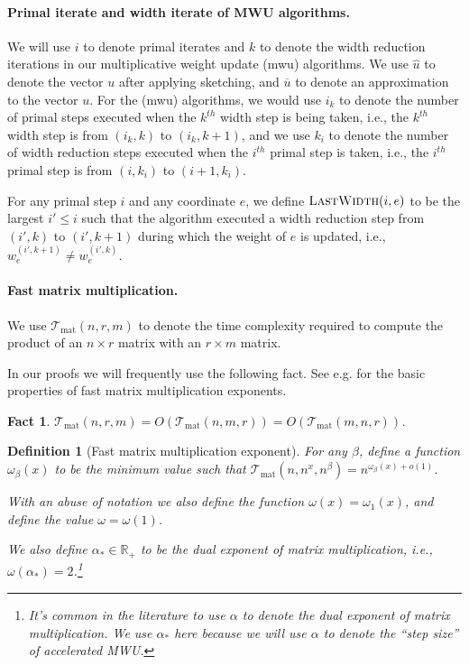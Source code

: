 \documentclass[11pt]{article}
\newtheorem{fact}[theorem]{Fact}
\newtheorem{definition}[theorem]{Definition}
\newcommand{\Tmat}{\mathcal{T}_{\mathrm{mat}}}
\newcommand\uu{\boldsymbol{\mathit{u}}}
\newcommand\ww{\boldsymbol{\mathit{w}}}
\newcommand{\wh}{\widehat}
\newcommand{\ov}{\overline}
\newcommand\R{\mathbb{R}}
\begin{document}
\paragraph{Primal iterate and width iterate of MWU algorithms.} We will use $i$ to denote primal iterates and $k$ to denote the width reduction iterations in our multiplicative weight update (mwu) algorithms. We use $\wh{\uu}$ to denote the vector $\uu$ after applying sketching, and $\ov{\uu}$ to denote an approximation to the vector $\uu$. For the (mwu) algorithms, we would use $i_k$ to denote the number of primal steps executed when the $k^{th}$ width step is being taken, i.e., the $k^{th}$ width step is from $(i_k, k)$ to $(i_k, k+1)$, and we use $k_i$ to denote the number of width reduction steps executed when the $i^{th}$ primal step is taken, i.e., the $i^{th}$ primal step is from $(i, k_i)$ to $(i+1, k_i)$.

For any primal step $i$ and any coordinate $e$, we define $\textsc{LastWidth}(i,e)$ to be the largest $i' \leq i$ such that the algorithm executed a width reduction step from $(i',k)$ to $(i',k+1)$ during which the weight of $e$ is updated, i.e., $\ww_e^{(i',k+1)} \neq \ww_e^{(i',k)}$. 



\paragraph{Fast matrix multiplication.}
We use $\Tmat(n,r,m)$ to denote the time complexity required to compute the product of an $n \times r$ matrix with an $r \times m$ matrix.

In our proofs we will frequently use the following fact. See e.g. \cite{bcs97} for the basic properties of fast matrix multiplication exponents.
\begin{fact}
$\Tmat(n,r,m) = O(\Tmat(n,m,r)) = O(\Tmat(m,n,r))$.
\end{fact}

\begin{definition}[Fast matrix multiplication exponent]
For any $\beta$, define a function $\omega_{\beta}(x)$ to be the minimum value such that $\Tmat(n,n^x,n^{\beta}) = n^{\omega_{\beta}(x) + o(1)}$. 

With an abuse of notation we also define the function $\omega(x) = \omega_1(x)$, and define the value $\omega = \omega(1)$.

We also define $\alpha_* \in \R_+$ to be the dual exponent of matrix multiplication, i.e., $\omega(\alpha_*) = 2$.\footnote{It's common in the literature to use $\alpha$ to denote the dual exponent of matrix multiplication. We use $\alpha_*$ here because we will use $\alpha$ to denote the ``step size'' of accelerated MWU.}
\end{definition}
\end{document}
